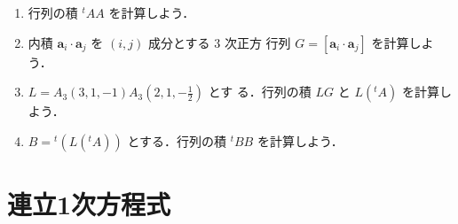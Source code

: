 \documentclass[11pt, uplatex, dvipdfmx]{jsarticle}
\begin{document}
\begin{enumerate}
  \vspace{1zh}

  \begin{enumerate}[(1)]
    \setlength{\itemsep}{1ex}

  \item 行列の積 ${}^{t}A A$ を計算しよう．
    
  \item 内積 $\bm{a}_i \cdot \bm{a}_j$ を $(i,j)$ 成分とする $3$ 次正方
    行列 $G=\left[ \bm{a}_i \cdot \bm{a}_j\right]$ を計算しよう．

  \item $L=A_3(3,1,-1) A_3\left(2,1,-\frac{1}{2}\right)$ とす
    る．行列の積 $LG$ と $L ({}^{t}A)$ を計算しよう．

  \item $B={}^{t}\left( L ({}^{t}A)\right)$ とする．行列の積 ${}^{t} B  B$ を計算しよう．
    
    
  \end{enumerate}
\end{enumerate}

\newpage

\section{連立1次方程式}\label{sec:system}
\end{document}
